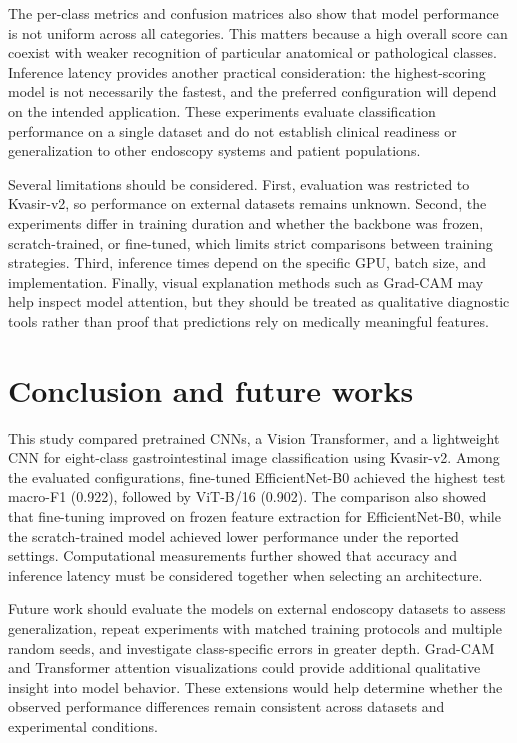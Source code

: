 \documentclass[conference]{IEEEtran}
\begin{document}
The per-class metrics and confusion matrices also show that model performance is not uniform across all categories. This matters because a high overall score can coexist with weaker recognition of particular anatomical or pathological classes. Inference latency provides another practical consideration: the highest-scoring model is not necessarily the fastest, and the preferred configuration will depend on the intended application. These experiments evaluate classification performance on a single dataset and do not establish clinical readiness or generalization to other endoscopy systems and patient populations.

Several limitations should be considered. First, evaluation was restricted to Kvasir-v2, so performance on external datasets remains unknown. Second, the experiments differ in training duration and whether the backbone was frozen, scratch-trained, or fine-tuned, which limits strict comparisons between training strategies. Third, inference times depend on the specific GPU, batch size, and implementation. Finally, visual explanation methods such as Grad-CAM may help inspect model attention, but they should be treated as qualitative diagnostic tools rather than proof that predictions rely on medically meaningful features.

\section{Conclusion and future works}

This study compared pretrained CNNs, a Vision Transformer, and a lightweight CNN for eight-class gastrointestinal image classification using Kvasir-v2. Among the evaluated configurations, fine-tuned EfficientNet-B0 achieved the highest test macro-F1 (0.922), followed by ViT-B/16 (0.902). The comparison also showed that fine-tuning improved on frozen feature extraction for EfficientNet-B0, while the scratch-trained model achieved lower performance under the reported settings. Computational measurements further showed that accuracy and inference latency must be considered together when selecting an architecture.

Future work should evaluate the models on external endoscopy datasets to assess generalization, repeat experiments with matched training protocols and multiple random seeds, and investigate class-specific errors in greater depth. Grad-CAM and Transformer attention visualizations could provide additional qualitative insight into model behavior. These extensions would help determine whether the observed performance differences remain consistent across datasets and experimental conditions.
\end{document}
